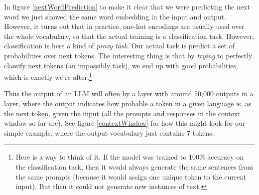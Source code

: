 
In figure \ref{nextWordPrediction} to make it clear that we were predicting the next word we just showed the same word embedding in the input and output.  However, it turns out that in practice, one-hot encodings are usually used over the whole vocabulary, so that the actual training is a classification task. However, classification is here a kind of \emph{proxy task}. Our actual task is predict a set of probabilities over next tokens.  The interesting thing is that by \emph{trying} to perfectly classify next tokens (an impossibly task), we end up with good probabilities, which is exactly we're after.\footnote{Here is a way to think of it. If the model was trained to 100\% accuracy on the classification task, then it would always generate the same sentences from the same prompts (because it would assign one unique token to the current input). But then it could not generate new instances of text.}

 Thus the output of an LLM will often by a layer with around 50,000 outputs in a  layer, where the output indicates how probable a token in a given language is, as the next token, given the input (all the prompts and responses in the context window so far are). See figure \ref{contextWindow} for how this might look for our simple example, where the output vocabulary just contains 7 tokens.

